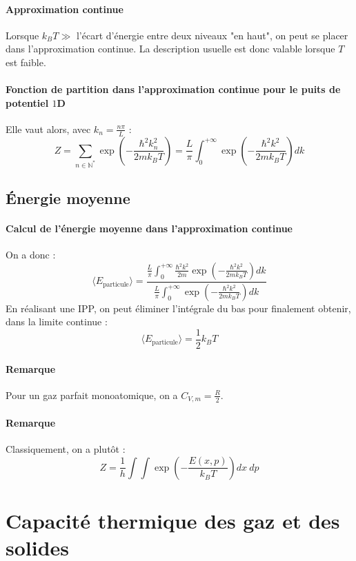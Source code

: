 \documentclass[french]{book}
\theoremstyle{plain}
\theoremstyle{definition}
\theoremstyle{remark}
\newcommand{\N}{\mathbb{N}}
\newcommand{\st}{^*}
\begin{document}
\paragraph{Approximation continue} Lorsque $k_BT\gg $ l'écart d'énergie entre deux niveaux "en haut", on peut se placer dans l'approximation continue. La description usuelle est donc valable lorsque $T$ est faible.

\paragraph{Fonction de partition dans l'approximation continue pour le puits de potentiel $1$D} Elle vaut alors, avec $k_n=\displaystyle\frac{n\pi}{L}$ : $$Z=\sum_{n\in\N\st}\exp\left(-\frac{\hbar^2k_n^2}{2mk_BT}\right)=\frac{L}{\pi}\int_{0}^{+\infty}\exp\left(-\frac{\hbar^2k^2}{2mk_BT}\right)dk$$
\subsection{Énergie moyenne}

\paragraph{Calcul de l'énergie moyenne dans l'approximation continue} On a donc : $$\langle E_\text{particule}\rangle=\displaystyle\frac{\frac{L}{\pi}\int_{0}^{+\infty}\frac{\hbar^2k^2}{2m}\exp\left(-\frac{\hbar^2k^2}{2mk_BT}\right)dk}{\frac{L}{\pi}\int_{0}^{+\infty}\exp\left(-\frac{\hbar^2k^2}{2mk_BT}\right)dk}$$ En réalisant une IPP, on peut éliminer l'intégrale du bas pour finalement obtenir, dans la limite continue : $$\langle E_\text{particule}\rangle=\frac{1}{2}k_BT$$

\paragraph{Remarque} Pour un gaz parfait monoatomique, on a $C_{V,m}=\displaystyle\frac{R}{2}$.

\paragraph{Remarque} Classiquement, on a plutôt : $$Z=\frac{1}{h}\int\int \exp\left(-\frac{E(x,p)}{k_BT}\right)dx\ dp$$

\section{Capacité thermique des gaz et des solides}
\end{document}
